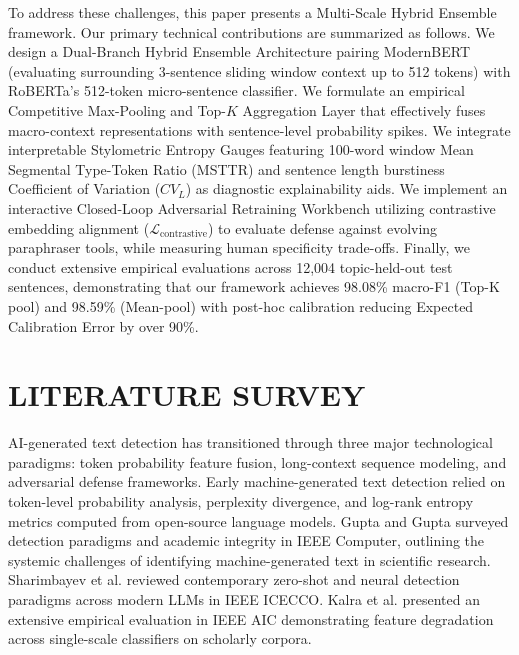 \documentclass[conference]{IEEEtran}
\begin{document}
To address these challenges, this paper presents a Multi-Scale Hybrid Ensemble framework. Our primary technical contributions are summarized as follows. We design a Dual-Branch Hybrid Ensemble Architecture pairing ModernBERT (evaluating surrounding 3-sentence sliding window context up to 512 tokens) with RoBERTa's 512-token micro-sentence classifier. We formulate an empirical Competitive Max-Pooling and Top-$K$ Aggregation Layer that effectively fuses macro-context representations with sentence-level probability spikes. We integrate interpretable Stylometric Entropy Gauges featuring 100-word window Mean Segmental Type-Token Ratio (MSTTR) and sentence length burstiness Coefficient of Variation ($CV_L$) as diagnostic explainability aids. We implement an interactive Closed-Loop Adversarial Retraining Workbench utilizing contrastive embedding alignment ($\mathcal{L}_{\text{contrastive}}$) to evaluate defense against evolving paraphraser tools, while measuring human specificity trade-offs. Finally, we conduct extensive empirical evaluations across 12,004 topic-held-out test sentences, demonstrating that our framework achieves 98.08\% macro-F1 (Top-K pool) and 98.59\% (Mean-pool) with post-hoc calibration reducing Expected Calibration Error by over 90\%.

\section{LITERATURE SURVEY}
AI-generated text detection has transitioned through three major technological paradigms: token probability feature fusion, long-context sequence modeling, and adversarial defense frameworks. Early machine-generated text detection relied on token-level probability analysis, perplexity divergence, and log-rank entropy metrics computed from open-source language models. Gupta and Gupta \cite{gupta2024navigating} surveyed detection paradigms and academic integrity in IEEE Computer, outlining the systemic challenges of identifying machine-generated text in scientific research. Sharimbayev et al. \cite{sharimbayev2026aigenerated} reviewed contemporary zero-shot and neural detection paradigms across modern LLMs in IEEE ICECCO. Kalra et al. \cite{kalra2024detection} presented an extensive empirical evaluation in IEEE AIC demonstrating feature degradation across single-scale classifiers on scholarly corpora.
\end{document}
